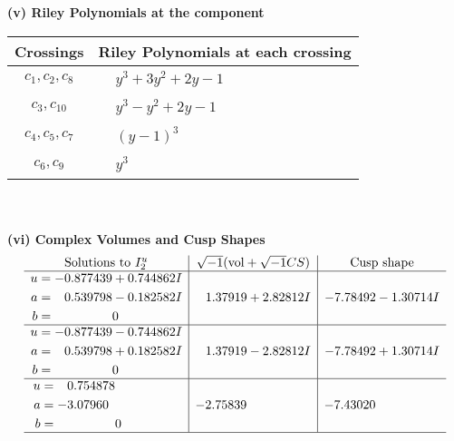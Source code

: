 \documentclass[1p]{elsarticle_modified}
\theoremstyle{definition}
\newcommand{\I}{\sqrt{-1}}
\begin{document}
\newpage\renewcommand{\arraystretch}{1}
\flushleft \textbf{(v) Riley Polynomials at the component}\newline \\
\begin{tabular}{m{50pt}|m{274pt}}
Crossings & \hspace{64pt}Riley Polynomials at each crossing \\
\hline $$\begin{aligned}c_{1},c_{2},c_{8}\end{aligned}$$&$\begin{aligned}
&y^3+3 y^2+2 y-1
\end{aligned}$\\
\hline $$\begin{aligned}c_{3},c_{10}\end{aligned}$$&$\begin{aligned}
&y^3- y^2+2 y-1
\end{aligned}$\\
\hline $$\begin{aligned}c_{4},c_{5},c_{7}\end{aligned}$$&$\begin{aligned}
&(y-1)^3
\end{aligned}$\\
\hline $$\begin{aligned}c_{6},c_{9}\end{aligned}$$&$\begin{aligned}
&y^3
\end{aligned}$\\
\hline
\end{tabular}\\~\\
\newpage\flushleft \textbf{(vi) Complex Volumes and Cusp Shapes}
$$\begin{array}{c|c|c}  
\text{Solutions to }I^u_{2}& \I (\text{vol} + \sqrt{-1}CS) & \text{Cusp shape}\\
 \hline 
\begin{aligned}
u &= -0.877439 + 0.744862 I \\
a &= \phantom{-}0.539798 - 0.182582 I \\
b &= \phantom{-0.000000 } 0\end{aligned}
 & \phantom{-}1.37919 + 2.82812 I & -7.78492 - 1.30714 I \\ \hline\begin{aligned}
u &= -0.877439 - 0.744862 I \\
a &= \phantom{-}0.539798 + 0.182582 I \\
b &= \phantom{-0.000000 } 0\end{aligned}
 & \phantom{-}1.37919 - 2.82812 I & -7.78492 + 1.30714 I \\ \hline\begin{aligned}
u &= \phantom{-}0.754878\phantom{ +0.000000I} \\
a &= -3.07960\phantom{ +0.000000I} \\
b &= \phantom{-0.000000 } 0\end{aligned}
 & -2.75839\phantom{ +0.000000I} & -7.43020\phantom{ +0.000000I}\\
 \hline 
 \end{array}$$\newpage\newpage\renewcommand{\arraystretch}{1}
\end{document}
